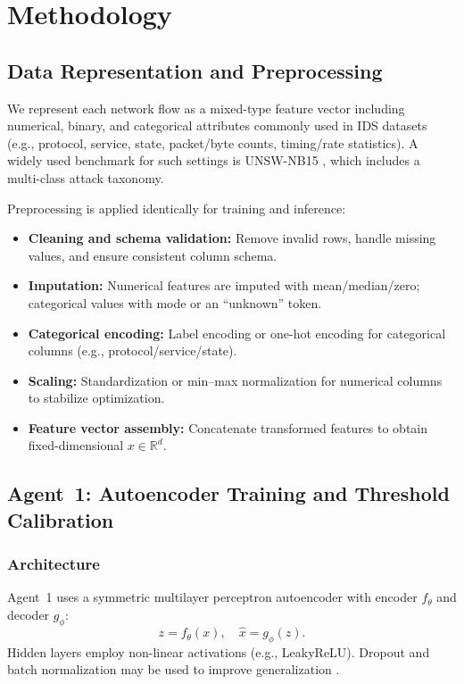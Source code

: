 \documentclass[conference]{IEEEtran}
\begin{document}
\section{Methodology}
\subsection{Data Representation and Preprocessing}
We represent each network flow as a mixed-type feature vector including numerical, binary, and categorical attributes commonly used in IDS datasets (e.g., protocol, service, state, packet/byte counts, timing/rate statistics). A widely used benchmark for such settings is UNSW-NB15 \cite{moustafa2015unsw}, which includes a multi-class attack taxonomy.

Preprocessing is applied identically for training and inference:
\begin{itemize}
  \item \textbf{Cleaning and schema validation:} Remove invalid rows, handle missing values, and ensure consistent column schema.
  \item \textbf{Imputation:} Numerical features are imputed with mean/median/zero; categorical values with mode or an ``unknown'' token.
  \item \textbf{Categorical encoding:} Label encoding or one-hot encoding for categorical columns (e.g., protocol/service/state).
  \item \textbf{Scaling:} Standardization or min--max normalization for numerical columns to stabilize optimization.
  \item \textbf{Feature vector assembly:} Concatenate transformed features to obtain fixed-dimensional $x \in \mathbb{R}^d$.
\end{itemize}

\subsection{Agent~1: Autoencoder Training and Threshold Calibration}
\subsubsection{Architecture}
Agent~1 uses a symmetric multilayer perceptron autoencoder with encoder $f_\theta$ and decoder $g_\phi$:
\begin{equation}
  z = f_{\theta}(x),\quad \hat{x} = g_{\phi}(z).
\end{equation}
Hidden layers employ non-linear activations (e.g., LeakyReLU). Dropout and batch normalization may be used to improve generalization \cite{goodfellow2016dl}.
\end{document}
